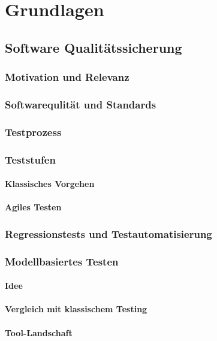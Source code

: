 \chapter{Grundlagen}
\label{sec:fundamentals}
\section{Software Qualitätssicherung}
\subsection{Motivation und Relevanz}
\subsection{Softwarequlität und Standards}
\subsection{Testprozess}
\subsection{Teststufen}
\subsubsection{Klassisches Vorgehen}
\subsubsection{Agiles Testen}
\subsection{Regressionstests und Testautomatisierung}
\subsection{Modellbasiertes Testen}
\subsubsection{Idee}
\subsubsection{Vergleich mit klassischem Testing}
\subsubsection{Tool-Landschaft}

